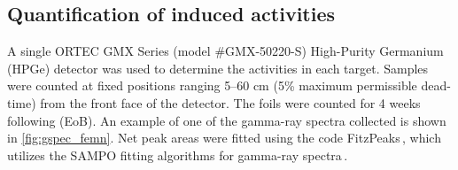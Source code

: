 \subsection{\label{sec:spectroscopy_U5_d}Quantification of induced activities}


A single 
ORTEC GMX Series (model \#GMX-50220-S)  High-Purity Germanium (HPGe) detector was used to determine the activities in each target.
Samples were counted at fixed positions ranging 5--60  cm (5\% maximum permissible dead-time) from the front face of the detector.
The foils were counted  for 
4 weeks following 
(EoB).
An example of one of the gamma-ray spectra collected 
is shown in \autoref{fig:gspec_femn}.
Net peak areas were fitted using the 
code FitzPeaks\,\cite{fitzgerald2009fitzpeaks}, which utilizes the SAMPO fitting algorithms for gamma-ray spectra\,\cite{Aarnio2001}.
% 
% 
